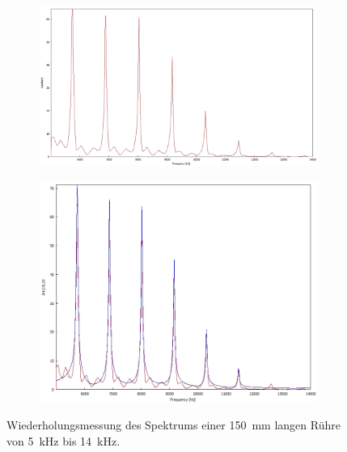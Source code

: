 \begin{figure}
\centering
\begin{subfigure}{0.4\textwidth}
\vspace{0.8cm}
\includegraphics[width=\textwidth]{content/messungen/Chapter1/1-2-2img.jpg}
\label{fig:1-2b:a}
\end{subfigure}
\begin{subfigure}{0.4\textwidth}
\includegraphics[width=\textwidth]{content/messungen/Chapter1/fit_img2.jpg}
\label{fig:1-2b:b}
\end{subfigure}
\caption{Wiederholungsmessung des Spektrums einer 150~mm langen Rühre von 5~kHz bis 14~kHz.}
\label{fig:1-2b}
\end{figure}

